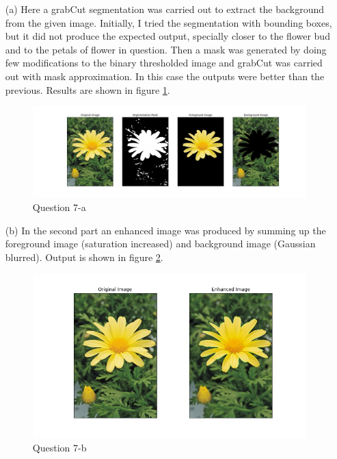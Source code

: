 \documentclass[11pt]{article}
\begin{document}
\begin{itemize}
    \item[(a)] Here a grabCut segmentation \cite{grabcut} was carried out to extract the background from the given image. Initially, I tried 
    the segmentation with bounding boxes, but it did not produce the expected output, specially closer to the flower bud and to the petals of flower 
    in question. Then a mask was generated by doing few modifications to the binary thresholded image and grabCut was carried out with mask approximation. 
    In this case the outputs were better than the previous. Results are shown in figure \ref{71}. 
                
    \begin{figure}[!h]
        \centering
        \includegraphics[width=\textwidth]{Images/71.jpg}
        \caption{Question 7-a}
        \label{71}
    \end{figure}

    \item[(b)] In the second part an enhanced image was produced by summing up the foreground image (saturation increased) and background image 
    (Gaussian blurred). Output is shown in figure \ref{72}. 
    
    \begin{figure}[!h]
        \centering
        \includegraphics[width=\textwidth]{Images/72.jpg}
        \caption{Question 7-b}
        \label{72}
    \end{figure}
    

\end{itemize}
\end{document}
